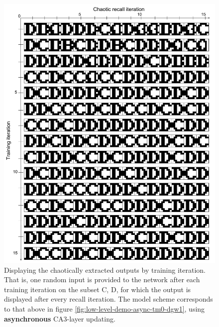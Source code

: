 \begin{figure}
    \centering
    \includegraphics[width=12cm]{fig/CD-chaotic-recall-async-tm0-dgw1-tau050}
    \caption{Displaying the chaotically extracted outputs by training iteration. That is, one random input is provided to the network after each training iteration on the subset {C, D}, for which the output is displayed after every recall iteration. The model scheme corresponds to that above in figure \ref{fig:low-level-demo-async-tm0-dgw1}, using \textbf{asynchronous} CA3-layer updating.}
\end{figure}

\cleardoublepage